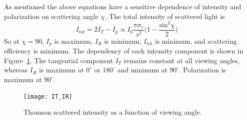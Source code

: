 

As mentioned the above equations have a sensitive dependence of intensity and polarization on scattering angle $\chi$. The total intensity of scattered light is
\begin{equation}
I_{tot} =  2I_T - I_p \propto I_0\frac{\pi \sigma_e}{z^2}\bigg(1 - \frac{\mathrm{sin}^2\chi}{2}\bigg)
\end{equation}
So at $\chi=90$, $I_p$ is maximum, $I_R$ is minimum, $I_{tot}$ is minimum, and scattering efficiency is minimum. The dependency of each intensity component is shown in Figure~\ref{fig:Ivchi}. The tangential component $I_T$ remains constant at all viewing angles, whereas $I_R$ is maximum at $0^{\circ}$ or $180^{\circ}$ and minimum at $90^{\circ}$. Polarization is maximum at $90^{\circ}$. 
\begin{figure}[!t]
\begin{center}
\texttt{[image: IT\_IR]}
\caption[Thomson scattered intensity as a function of viewing angle]{Thomson scattered intensity as a function of viewing angle.}
\label{fig:Ivchi}
\end{center}
\end{figure}

